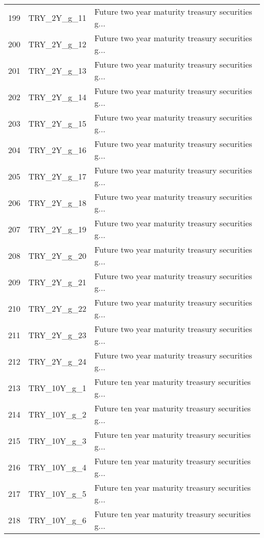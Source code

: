 \begin{tabular}{lll}
199 &                TRY\_2Y\_g\_11 &  Future two year maturity treasury securities g... \\
200 &                TRY\_2Y\_g\_12 &  Future two year maturity treasury securities g... \\
201 &                TRY\_2Y\_g\_13 &  Future two year maturity treasury securities g... \\
202 &                TRY\_2Y\_g\_14 &  Future two year maturity treasury securities g... \\
203 &                TRY\_2Y\_g\_15 &  Future two year maturity treasury securities g... \\
204 &                TRY\_2Y\_g\_16 &  Future two year maturity treasury securities g... \\
205 &                TRY\_2Y\_g\_17 &  Future two year maturity treasury securities g... \\
206 &                TRY\_2Y\_g\_18 &  Future two year maturity treasury securities g... \\
207 &                TRY\_2Y\_g\_19 &  Future two year maturity treasury securities g... \\
208 &                TRY\_2Y\_g\_20 &  Future two year maturity treasury securities g... \\
209 &                TRY\_2Y\_g\_21 &  Future two year maturity treasury securities g... \\
210 &                TRY\_2Y\_g\_22 &  Future two year maturity treasury securities g... \\
211 &                TRY\_2Y\_g\_23 &  Future two year maturity treasury securities g... \\
212 &                TRY\_2Y\_g\_24 &  Future two year maturity treasury securities g... \\
213 &                TRY\_10Y\_g\_1 &  Future ten year maturity treasury securities g... \\
214 &                TRY\_10Y\_g\_2 &  Future ten year maturity treasury securities g... \\
215 &                TRY\_10Y\_g\_3 &  Future ten year maturity treasury securities g... \\
216 &                TRY\_10Y\_g\_4 &  Future ten year maturity treasury securities g... \\
217 &                TRY\_10Y\_g\_5 &  Future ten year maturity treasury securities g... \\
218 &                TRY\_10Y\_g\_6 &  Future ten year maturity treasury securities g... \\

\end{tabular}
